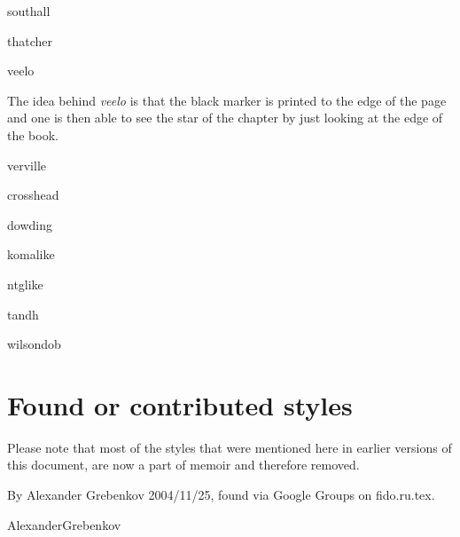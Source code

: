 \newpage

\begin{showchapterstyle}{southall}
\end{showchapterstyle}
\begin{showchapterstyle}{thatcher}
\end{showchapterstyle}
\begin{showchapterstyle}{veelo}
\usepackage{graphicx}
\end{showchapterstyle}

The idea behind \emph{veelo} is that the black marker is printed to
the edge of the page and one is then able to see the star of the
chapter by just looking at the edge of the book.

\begin{showchapterstyle}{verville}
\end{showchapterstyle}

\newpage

\begin{showchapterstyle}{crosshead}
\end{showchapterstyle}
\begin{showchapterstyle}{dowding}
\end{showchapterstyle}
\begin{showchapterstyle}{komalike}
\end{showchapterstyle}
\begin{showchapterstyle}{ntglike}
\end{showchapterstyle}

\newpage

\begin{showchapterstyle}{tandh}
\end{showchapterstyle}
\begin{showchapterstyle}{wilsondob}
\end{showchapterstyle}






\chapter{Found or contributed styles}

Please note that most of the styles that were mentioned here in
earlier versions of this document, are now a part of memoir and
therefore removed.


%
By Alexander Grebenkov 2004/11/25, found via Google Groups on fido.ru.tex.
\begin{showchapterstyle}{AlexanderGrebenkov}
\end{showchapterstyle}

